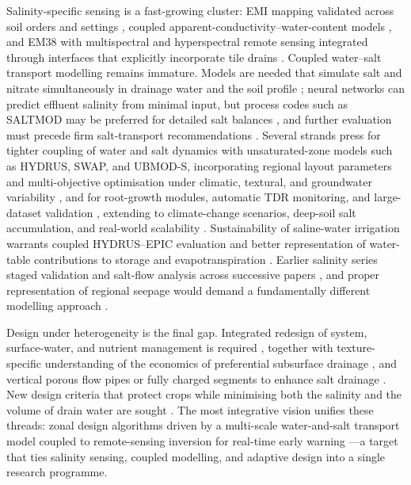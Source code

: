 Salinity-specific sensing is a fast-growing cluster: EMI mapping validated across
soil orders and settings \parencite{Narjary2024}, coupled
apparent-conductivity--water-content models \parencite{Yu2025}, and EM38 with
multispectral and hyperspectral remote sensing integrated through interfaces that
explicitly incorporate tile drains \parencite{Singh2020d,Jayawardane2001}.
Coupled water--salt transport modelling remains immature. Models are needed that
simulate salt and nitrate simultaneously in drainage water and the soil profile
\parencite{Ebrahimian2015}; neural networks can predict effluent salinity from
minimal input, but process codes such as SALTMOD may be preferred for detailed
salt balances \parencite{Sarangi2006}, and further evaluation must precede firm
salt-transport recommendations \parencite{Hirekhan2007}. Several strands press
for tighter coupling of water and salt dynamics with unsaturated-zone models such
as HYDRUS, SWAP, and UBMOD-S, incorporating regional layout parameters and
multi-objective optimisation under climatic, textural, and groundwater
variability \parencite{Han2025,Wang2025c,Wang2024c}, and for root-growth modules,
automatic TDR monitoring, and large-dataset validation
\parencite{Liu2022}, extending to climate-change scenarios, deep-soil salt
accumulation, and real-world scalability \parencite{Liu2026}. Sustainability of
saline-water irrigation warrants coupled HYDRUS--EPIC evaluation
\parencite{Feng2019} and better representation of water-table contributions to
storage and evapotranspiration \parencite{Jia2017}. Earlier salinity series
staged validation and salt-flow analysis across successive papers
\parencite{KARAJEH1994}, and proper representation of regional seepage would
demand a fundamentally different modelling approach \parencite{Kelleners2000}.

Design under heterogeneity is the final gap. Integrated redesign of system,
surface-water, and nutrient management is required \parencite{vandenEertwegh2006},
together with texture-specific understanding of the economics of preferential
subsurface drainage \parencite{Neha2022}, and vertical porous flow pipes or fully
charged segments to enhance salt drainage
\parencite{Wang2024d,Yao2024,Jayawardane2001}. New design criteria that protect
crops while minimising both the salinity and the volume of drain water are sought
\parencite{Christen2001}. The most integrative vision unifies these threads:
zonal design algorithms driven by a multi-scale water-and-salt transport model
coupled to remote-sensing inversion for real-time early warning
\parencite{Zhu2025b}---a target that ties salinity sensing, coupled modelling, and
adaptive design into a single research programme.